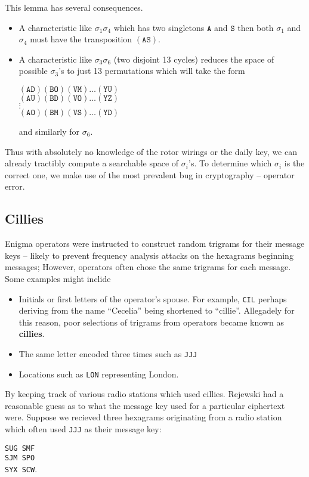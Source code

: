 This lemma has several consequences.
\begin{itemize}
	\item A characteristic like $\sigma_1\sigma_4$ which has two
	      singletons $\texttt{A}$ and $\texttt{S}$ then both $\sigma_1$ and
	      $\sigma_4$ must have the transposition $(\texttt{AS})$.
	\item A characteristic like $\sigma_3\sigma_6$ (two disjoint 13
	      cycles) reduces the space of possible $\sigma_3$'s to just 13
	      permutations which will take the form
	      \begin{center}
		      $(\texttt{AD})(\texttt{BO})(\texttt{VM})\dots(\texttt{YU})$ \\
		      $(\texttt{AU})(\texttt{BD})(\texttt{VO})\dots(\texttt{YZ})$ \\
		      $\vdots$                                       \\
		      $(\texttt{AO})(\texttt{BM})(\texttt{VS})\dots(\texttt{YD})$
	      \end{center}
	      and similarly for $\sigma_6$.
\end{itemize}
Thus with absolutely no knowledge of the rotor wirings or the daily
key, we can already tractibly compute a searchable space of
$\sigma_i$'s. To determine which $\sigma_i$ is the correct one, we
make use of the most prevalent bug in cryptography -- operator error.

\subsection{Cillies}\label{cillies}
Enigma operators were instructed to construct random trigrams for
their message keys -- likely to prevent frequency analysis attacks on
the hexagrams beginning messages; However, operators often chose the
same trigrams for each message. Some examples might inclide
\begin{itemize}
	\item Initials or first letters of the operator's spouse. For
	      example, \texttt{CIL} perhaps deriving from the name ``Cecelia''
	      being shortened to ``cillie''. Allegadely for this reason, poor
	      selections of trigrams from operators became known as {\bf{cillies}}.
	\item The same letter encoded three times such as \texttt{JJJ}
	\item Locations such as \texttt{LON} representing London.

\end{itemize}
By keeping track of various radio stations which used cillies.
Rejewski had a reasonable guess as to what the message key used for a
particular ciphertext were. Suppose we recieved three hexagrams
originating from a radio station which often used \texttt{JJJ} as
their message key:
\begin{center}
	\texttt{SUG SMF}\\
	\texttt{SJM SPO}\\
	\texttt{SYX SCW}.
\end{center}

